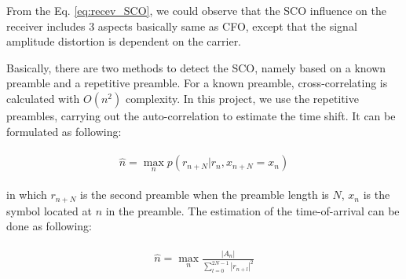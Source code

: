 \documentclass[a4paper]{article}
\begin{document}
	From the Eq. \ref{eq:recev_SCO}, we could observe that the SCO influence on the receiver includes 3 aspects basically same as CFO, except that the signal amplitude distortion is dependent on the carrier. 
	
	Basically, there are two methods to detect the SCO, namely based on a known preamble and a repetitive preamble. For a known preamble, cross-correlating is calculated with $O(n^2)$ complexity. In this project, we use the repetitive preambles, carrying out the auto-correlation to estimate the time shift. It can be formulated as following:
    
    \begin{align} 
		\begin{split}
			\hat{n} = \max_n p (r_{n+N} | r_n, x_{n+N} = x_n)
		\end{split}
		\label{eq:SCO_auto}
	\end{align}
    
    in which $r_{n+N}$ is the second preamble when the preamble length is $N$, $x_n$ is the symbol located at $n$ in the preamble. The estimation of the time-of-arrival can be done as following:
    
    \begin{align} 
		\begin{split}
			\hat{n} = \max_n \frac{|A_n|}{\sum_{l=0}^{2N-1} |r_{n+l}|^2}
		\end{split}
		\label{eq:SCO_final}
	\end{align}
\end{document}
